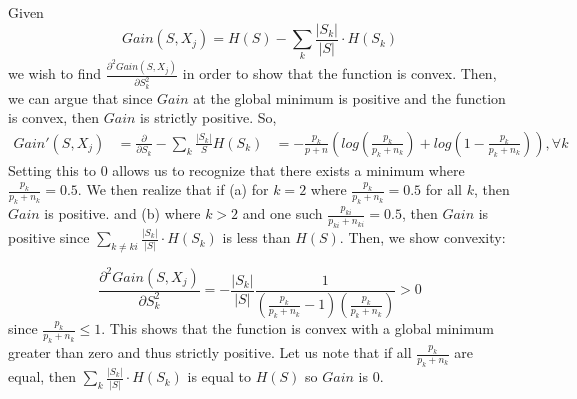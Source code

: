 \documentclass{article}
\begin{document}
Given
\begin{equation*}
Gain(S,X_{j}) = H(S)-\sum_{k}\frac{|S_{k}|}{|S|}\cdot H(S_k)
\end{equation*}
we wish to find \(\frac{\partial^2 Gain(S,X_j)}{\partial S_k^2}\) in order to show that the function is convex. Then, we can argue that since \(Gain\) at the global minimum is positive and the function is convex, then \(Gain\) is strictly positive. So, 
\begin{align*}
Gain'(S,X_j)
&= \frac{\partial}{\partial S_k} -\sum_k \frac{|S_k|}{S} H(S_k)
&= -\frac{p_k}{p+n}(log(\frac{p_k}{p_k+n_k}) + log(1-\frac{p_k}{p_k+n_k})), \forall k
\end{align*}
Setting this to 0 allows us to recognize that there exists a minimum where \(\frac{p_k}{p_k+n_k} = 0.5\). We then realize that if (a) for \(k = 2\) where \(\frac{p_k}{p_k+n_k} = 0.5\) for all \(k\), then \(Gain\) is positive. and (b) where \(k > 2\) and one such \(\frac{p_{ki}}{p_{ki}+n_{ki}} = 0.5\), then \(Gain\) is positive since \(\sum_{k \neq ki}\frac{|S_{k}|}{|S|}\cdot H(S_k)\) is less than \(H(S)\). Then, we show convexity:

\begin{equation*}
\frac{\partial^2 Gain(S,X_j)}{\partial S_k^2} 
= -\frac{|S_k|}{|S|} \frac{1}{(\frac{p_k}{p_k+n_k}-1)(\frac{p_k}{p_k+n_k})}
> 0
\end{equation*}
since \(\frac{p_k}{p_k+n_k} \leq 1 \). This shows that the function is convex with a global minimum greater than zero and thus strictly positive. Let us note that if all \(\frac{p_k}{p_k+n_k}\) are equal, then \(\sum_{k}\frac{|S_{k}|}{|S|}\cdot H(S_k)\) is equal to \(H(S)\) so \(Gain\) is 0.
\end{document}
